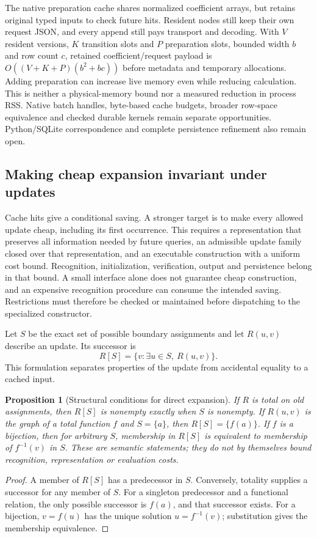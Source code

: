 \documentclass[11pt,a4paper]{article}
\numberwithin{equation}{section}
\theoremstyle{plain}
\newtheorem{proposition}[lemma]{Proposition}
\theoremstyle{definition}
\theoremstyle{remark}
\begin{document}
The native preparation cache shares normalized coefficient arrays, but retains original typed inputs to check future hits. Resident nodes still keep their own request JSON, and every append still pays transport and decoding. With $V$ resident versions, $K$ transition slots and $P$ preparation slots, bounded width $b$ and row count $c$, retained coefficient/request payload is $O((V+K+P)(b^2+bc))$ before metadata and temporary allocations. Adding preparation can increase live memory even while reducing calculation. This is neither a physical-memory bound nor a measured reduction in process RSS. Native batch handles, byte-based cache budgets, broader row-space equivalence and checked durable kernels remain separate opportunities. Python/SQLite correspondence and complete persistence refinement also remain open.

\subsection{Making cheap expansion invariant under updates}
\label{sec:closed-expansion}

Cache hits give a conditional saving. A stronger target is to make every allowed update cheap, including its first occurrence. This requires a representation that preserves all information needed by future queries, an admissible update family closed over that representation, and an executable construction with a uniform cost bound. Recognition, initialization, verification, output and persistence belong in that bound. A small interface alone does not guarantee cheap construction, and an expensive recognition procedure can consume the intended saving. Restrictions must therefore be checked or maintained before dispatching to the specialized constructor.

Let $S$ be the exact set of possible boundary assignments and let $R(u,v)$ describe an update. Its successor is
\[
R[S]=\{v:\exists u\in S,\ R(u,v)\}.
\]
This formulation separates properties of the update from accidental equality to a cached input.

\begin{proposition}[Structural conditions for direct expansion]
\label{prop:structural-expansion}
If $R$ is total on old assignments, then $R[S]$ is nonempty exactly when $S$ is nonempty. If $R(u,v)$ is the graph of a total function $f$ and $S=\{a\}$, then $R[S]=\{f(a)\}$. If $f$ is a bijection, then for arbitrary $S$, membership in $R[S]$ is equivalent to membership of $f^{-1}(v)$ in $S$. These are semantic statements; they do not by themselves bound recognition, representation or evaluation costs.
\end{proposition}
\begin{proof}
A member of $R[S]$ has a predecessor in $S$. Conversely, totality supplies a successor for any member of $S$. For a singleton predecessor and a functional relation, the only possible successor is $f(a)$, and that successor exists. For a bijection, $v=f(u)$ has the unique solution $u=f^{-1}(v)$; substitution gives the membership equivalence.
\end{proof}
\end{document}

